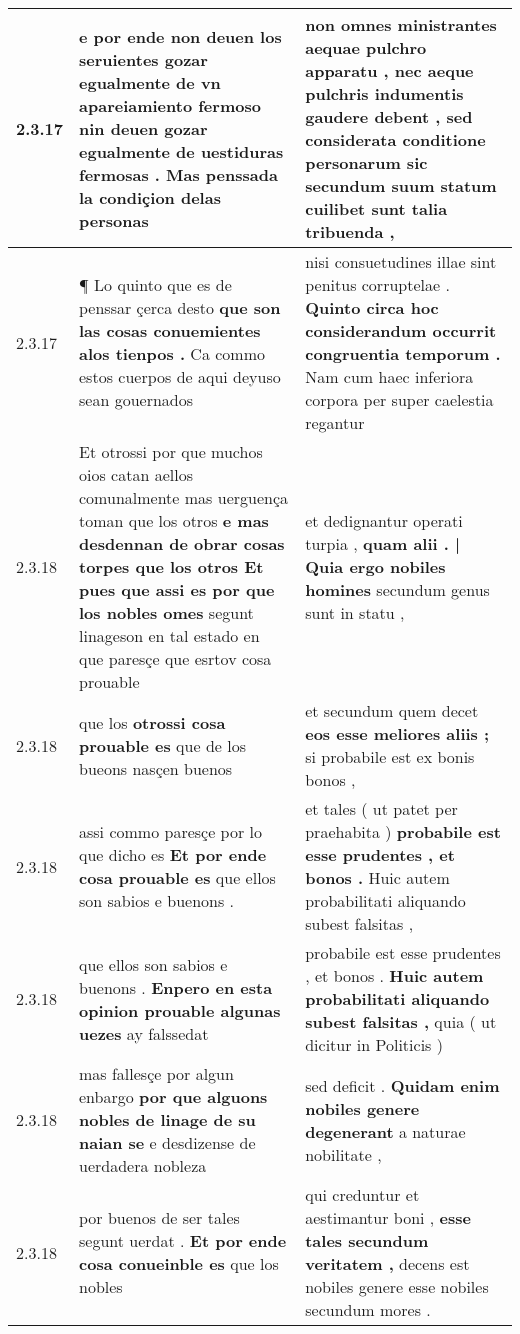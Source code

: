 \begin{tabular}{|p{1cm}|p{6.5cm}|p{6.5cm}|}
2.3.17 & e por ende non deuen los seruientes gozar egualmente de vn apareiamiento fermoso \textbf{ nin deuen gozar egualmente de uestiduras fermosas . } Mas penssada la condiçion delas personas & non omnes ministrantes aequae pulchro apparatu , \textbf{ nec aeque pulchris indumentis gaudere debent , } sed considerata conditione personarum sic secundum suum statum cuilibet sunt talia tribuenda , \\\hline
2.3.17 & ¶ Lo quinto que es de penssar çerca desto \textbf{ que son las cosas conuemientes alos tienpos . } Ca commo estos cuerpos de aqui deyuso sean gouernados & nisi consuetudines illae sint penitus corruptelae . \textbf{ Quinto circa hoc considerandum occurrit congruentia temporum . } Nam cum haec inferiora corpora per super caelestia regantur \\\hline
2.3.18 & Et otrossi por que muchos oios catan aellos comunalmente mas uerguença toman que los otros \textbf{ e mas desdennan de obrar cosas torpes que los otros Et pues que assi es por que los nobles omes } segunt linageson en tal estado en que paresçe que esrtov cosa prouable & et dedignantur operati turpia , \textbf{ quam alii . | Quia ergo nobiles homines } secundum genus sunt in statu , \\\hline
2.3.18 & que los \textbf{ otrossi cosa prouable es } que de los bueons nasçen buenos & et secundum quem decet \textbf{ eos esse meliores aliis ; } si probabile est ex bonis bonos , \\\hline
2.3.18 & assi commo paresçe por lo que dicho es \textbf{ Et por ende cosa prouable es } que ellos son sabios e buenons . & et tales ( ut patet per praehabita ) \textbf{ probabile est esse prudentes , et bonos . } Huic autem probabilitati aliquando subest falsitas , \\\hline
2.3.18 & que ellos son sabios e buenons . \textbf{ Enpero en esta opinion prouable algunas uezes } ay falssedat & probabile est esse prudentes , et bonos . \textbf{ Huic autem probabilitati aliquando subest falsitas , } quia ( ut dicitur in Politicis ) \\\hline
2.3.18 & mas fallesçe por algun enbargo \textbf{ por que alguons nobles de linage de su naian se } e desdizense de uerdadera nobleza & sed deficit . \textbf{ Quidam enim nobiles genere degenerant } a naturae nobilitate , \\\hline
2.3.18 & por buenos de ser tales segunt uerdat . \textbf{ Et por ende cosa conueinble es } que los nobles & qui creduntur et aestimantur boni , \textbf{ esse tales secundum veritatem , } decens est nobiles genere esse nobiles secundum mores . \\\hline

\end{tabular}
